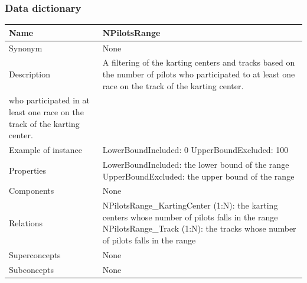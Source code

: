 \documentclass{beamer}
\begin{document}
\begin{frame}
    \frametitle{Data dictionary}
    \begin{table}
    \tiny
    \begin{tabular}{|p{2cm}|p{6cm}|}
    \hline
    Name & \textbf{NPilotsRange} \\
    \hline
    Synonym & None \\
    \hline
    Description & A filtering of the karting centers and tracks based on the number of 
    pilots who participated to at least one race on the track of the karting center. \\
    who participated in at least one race on the track of the karting center. \\
    \hline
    Example of instance &
    LowerBoundIncluded: 0 \newline
    UpperBoundExcluded: 100 \\
    \hline
    Properties &
    LowerBoundIncluded: the lower bound of the range \newline
    UpperBoundExcluded: the upper bound of the range \\
    \hline
    Components & None \\
    \hline
    Relations &
    NPilotsRange\_KartingCenter (1:N): the karting centers whose number of pilots falls in the range \newline
    NPilotsRange\_Track (1:N): the tracks whose number of pilots falls in the range \\
    \hline
    Superconcepts & None \\
    \hline
    Subconcepts & None \\
    \hline
    \end{tabular}
    \end{table}
\end{frame}
\end{document}

